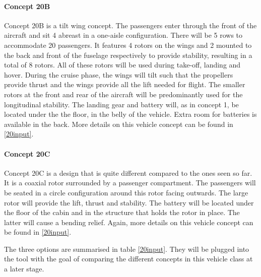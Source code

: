 \paragraph{Concept 20B}
Concept 20B is a tilt wing concept. The passengers enter through the front of the aircraft and sit 4 abreast in a one-aisle configuration. There will be 5 rows to accommodate 20 passengers. It features 4 rotors on the wings and 2 mounted to the back and front of the fuselage respectively to provide stability, resulting in a total of 8 rotors. All of these rotors will be used during take-off, landing and hover. During the cruise phase, the wings will tilt such that the propellers provide thrust and the wings provide all the lift needed for flight. The smaller rotors at the front and rear of the aircraft will be predominantly used for the longitudinal stability. The landing gear and battery will, as in concept 1, be located under the the floor, in the belly of the vehicle. Extra room for batteries is available in the back. More details on this vehicle concept can be found in \autoref{20input}.  

\paragraph{Concept 20C}
Concept 20C is a design that is quite different compared to the ones seen so far. It is a coaxial rotor surrounded by a passenger compartment. The passengers will be seated in a circle configuration around this rotor facing outwards. The large rotor will provide the lift, thrust and stability. The battery will be located under the floor of the cabin and in the structure that holds the rotor in place. The latter will cause a bending relief.  Again, more details on this vehicle concept can be found in \autoref{20input}.  

The three options are summarised in table \autoref{20input}. They will be plugged into the tool with the goal of comparing the different concepts in this vehicle class at a later stage. 

